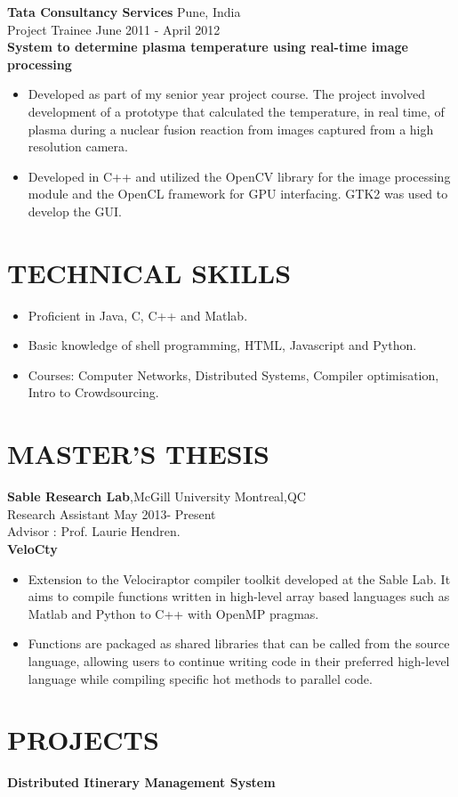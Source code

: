 \documentclass[11pt]{res} %
\begin{document}
\begin{resume}
\noindent \textbf{Tata Consultancy Services} \hfill \hfill Pune, India\\
\noindent Project Trainee \hfill \hfill June 2011 - April 2012 \\
\textbf{System to determine plasma temperature using real-time image processing}
\begin{itemize}
\item Developed as part of my senior year project course. The project involved development of a prototype that calculated the
temperature, in real time, of plasma during a nuclear fusion reaction from images captured from a high resolution camera.
\item Developed in C++ and utilized the OpenCV library for the image processing module and the OpenCL framework for GPU
interfacing. GTK2 was used to develop the GUI.
\end{itemize}

\section{TECHNICAL SKILLS} 
\begin{itemize} 
\item Proficient in Java, C, C++ and Matlab.
\item Basic knowledge of shell programming, HTML, Javascript and Python.
\item Courses: Computer Networks, Distributed Systems, Compiler optimisation, Intro to Crowdsourcing.
\end{itemize}
\section{MASTER'S THESIS} 
\noindent \textbf{Sable Research Lab},McGill University  \hfill \hfill Montreal,QC\\
\noindent Research Assistant \hfill \hfill May 2013- Present\\
Advisor : Prof. Laurie Hendren. \\
\textbf{VeloCty}
\begin{itemize}
\item Extension to the Velociraptor compiler toolkit developed at the Sable Lab. It aims to compile functions written in
high-level array based languages such as Matlab and Python to C++ with OpenMP pragmas. 
\item Functions are packaged as shared libraries that can be called from the source language, allowing users to continue
writing code in their preferred high-level language while compiling specific hot methods to parallel code.
\end{itemize}
\section{PROJECTS} 
\textbf{Distributed Itinerary Management System}
\end{resume}
\end{document}
